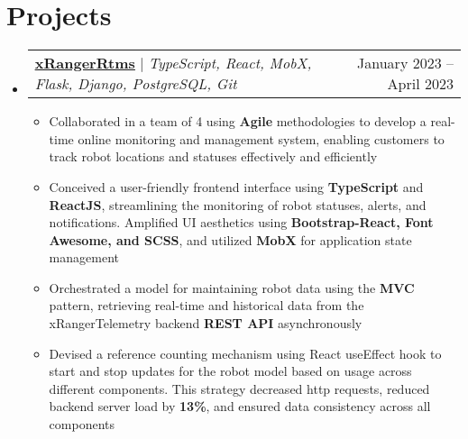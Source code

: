 \documentclass[letterpaper,11pt]{article}
\makeatletter
\newcommand{\resumeItem}[1]{
  \item\small{
    {#1 \vspace{-2pt}}
  }
}
\newcommand{\resumeProjectHeading}[2]{
    \item
    \begin{tabular*}{0.97\textwidth}{l@{\extracolsep{\fill}}r}
      \small#1 & #2 \\
    \end{tabular*}\vspace{-7pt}
}
\newcommand{\resumeSubHeadingListStart}{\begin{itemize}[leftmargin=0.15in, label={}]}
\newcommand{\resumeSubHeadingListEnd}{\end{itemize}}
\newcommand{\resumeItemListStart}{\begin{itemize}}
\newcommand{\resumeItemListEnd}{\end{itemize}\vspace{-5pt}}
\makeatother
\begin{document}
\section{Projects}
    \resumeSubHeadingListStart
      \resumeProjectHeading
          {\textbf{\underline{\href{https://github.com/xRanger-RTMS}{xRangerRtms}}} $|$ \emph{TypeScript, React, MobX, Flask, Django, PostgreSQL, Git}}{January 2023 -- April 2023}
          \resumeItemListStart
            \resumeItem{Collaborated in a team of 4 using \textbf{Agile} methodologies to develop a real-time online monitoring and management system, enabling customers to track robot locations and statuses effectively and efficiently}
            \resumeItem{Conceived a user-friendly frontend interface using \textbf{TypeScript} and \textbf{ReactJS}, streamlining the monitoring of robot statuses, alerts, and notifications. Amplified UI aesthetics using \textbf{Bootstrap-React, Font Awesome, and SCSS}, and utilized \textbf{MobX} for application state management}
            \resumeItem{Orchestrated a model for maintaining robot data using the \textbf{MVC} pattern, retrieving real-time and historical data from the xRangerTelemetry backend \textbf{REST API} asynchronously}
            \resumeItem{Devised a reference counting mechanism using React useEffect hook to start and stop updates for the robot model based on usage across different components. This strategy decreased http requests, reduced backend server load by \textbf{13\%}, and ensured data consistency across all components}
          \resumeItemListEnd
    \resumeSubHeadingListEnd
\end{document}
